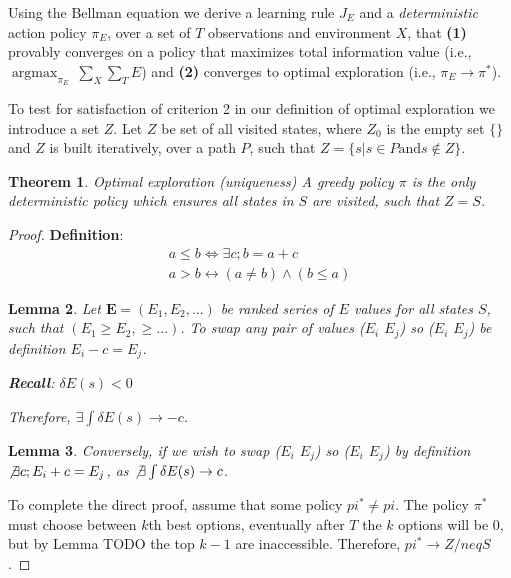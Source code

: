 \documentclass[9pt,twocolumn,twoside]{pnas-new}
\DeclareMathOperator*{\argmax}{argmax}
\newtheorem{theorem}{Theorem}[section]
\newtheorem{lemma}[theorem]{Lemma}
\begin{document}
Using the Bellman equation we derive a learning rule $J_E$ and a \textit{deterministic} action policy $\pi_E$, over a set of $T$ observations and environment $X$, that \textbf{(1)} provably converges on a policy that maximizes total information value (i.e., $\argmax_{\pi_E} \ \sum_X \sum_T E$) and \textbf{(2)} converges to optimal exploration (i.e., $\pi_E \rightarrow \pi^*$).

To test for satisfaction of criterion 2 in our definition of optimal exploration we introduce a set $Z$. Let $Z$ be set of all visited states, where $Z_0$ is the empty set $\{\}$ and $Z$ is built iteratively, over a path $P$, such that $Z = \{s | s \in P \text{and} s \not\in Z\}$.

\begin{theorem}{Optimal exploration (uniqueness)}
A greedy policy $\pi$ is the only deterministic policy which ensures all states in $S$ are visited, such that $Z = S$.
\end{theorem}

\begin{proof}
    \textbf{Definition}: 
    \begin{align}
        a \leq b \Leftrightarrow \exists c; b = a + c \\
        a > b \leftrightarrow (a \neq b) \wedge (b \leq a) 
    \end{align}

    \begin{lemma}
    Let $\textbf{E} = (E_1, E_2, ...)$ be ranked series of $E$ values for all states $S$, such that $(E_1 \geq E_2, \geq ...)$. To swap any pair of values ($E_i$ \geq $E_j$) so ($E_i$ \leq $E_j$) be definition $E_i - c = E_j$.  

    \textbf{Recall}: $\delta E(s) < 0$ 

    Therefore, $\exists \int \delta E(s) \rightarrow -c$. 
    \end{lemma}

    \begin{lemma}
    Conversely, if we wish to swap ($E_i$ \leq $E_j$) so ($E_i$ \geq $E_j$) by definition $\not \exists c; E_i + c = E_j$, as $\not \exists \int \delta E(s) \rightarrow c$. 
    \end{lemma}

    To complete the direct proof, assume that some policy $pi^* \neq pi$. The policy $\pi^*$ must choose between $k$th best options, eventually after $T$ the $k$ options will be 0, but by Lemma TODO the top $k-1$ are inaccessible. Therefore, $pi^* \rightarrow Z /neq S$.
\end{proof}
\end{document}
